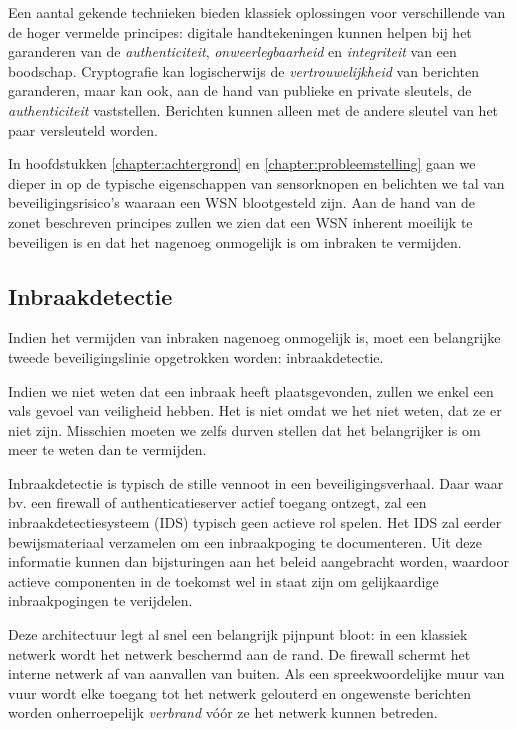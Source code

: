 Een aantal gekende technieken bieden klassiek oplossingen voor verschillende
van de hoger vermelde principes: digitale handtekeningen kunnen helpen bij het
garanderen van de \emph{authenticiteit}, \emph{onweerlegbaarheid} en
\emph{integriteit} van een boodschap. Cryptografie kan logischerwijs de
\emph{vertrouwelijkheid} van berichten garanderen, maar kan ook, aan de hand
van publieke en private sleutels, de \emph{authenticiteit} vaststellen.
Berichten kunnen alleen met de andere sleutel van het paar versleuteld worden.

In hoofdstukken \ref{chapter:achtergrond} en \ref{chapter:probleemstelling}
gaan we dieper in op de typische eigenschappen van sensorknopen en belichten we
tal van beveiligingsrisico's waaraan een WSN blootgesteld zijn. Aan de hand van
de zonet beschreven principes zullen we zien dat een WSN inherent moeilijk te
beveiligen is en dat het nagenoeg onmogelijk is om inbraken te vermijden.

\subsection{Inbraakdetectie}
\label{subsection:detection}

Indien het vermijden van inbraken nagenoeg onmogelijk is, moet een belangrijke
tweede beveiligingslinie opgetrokken worden: inbraakdetectie.

Indien we niet weten dat een inbraak heeft plaatsgevonden, zullen we enkel een
vals gevoel van veiligheid hebben. Het is niet omdat we het niet weten, dat ze
er niet zijn. Misschien moeten we zelfs durven stellen dat het belangrijker is
om meer te weten dan te vermijden.

Inbraakdetectie is typisch de stille vennoot in een beveiligingsverhaal. Daar
waar bv. een firewall of authenticatieserver actief toegang ontzegt, zal een
inbraakdetectiesysteem (IDS) typisch geen actieve rol spelen. Het IDS zal
eerder bewijsmateriaal verzamelen om een inbraakpoging te documenteren. Uit
deze informatie kunnen dan bijsturingen aan het beleid aangebracht worden,
waardoor actieve componenten in de toekomst wel in staat zijn om gelijkaardige
inbraakpogingen te verijdelen.

Deze architectuur legt al snel een belangrijk pijnpunt bloot: in een klassiek
netwerk wordt het netwerk beschermd aan de rand. De firewall schermt het
interne netwerk af van aanvallen van buiten. Als een spreekwoordelijke muur van
vuur wordt elke toegang tot het netwerk gelouterd en ongewenste berichten
worden onherroepelijk \emph{verbrand} v\'o\'or ze het netwerk kunnen betreden.

